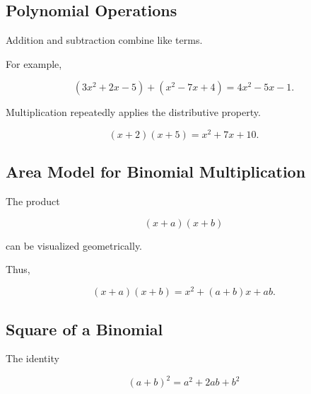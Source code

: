\subsection{Polynomial Operations}
\label{subsec:polynomial-operations}

Addition and subtraction combine like terms.

For example,

\[ (3x^2+2x-5)+(x^2-7x+4)=4x^2-5x-1. \]

Multiplication repeatedly applies the distributive property.

\[ (x+2)(x+5)=x^2+7x+10. \]

\subsection{Area Model for Binomial Multiplication}
\label{subsec:area-model-binomial}

The product

\[ (x+a)(x+b) \]

can be visualized geometrically.

\begin{center}
\end{center}

Thus,

\[ (x+a)(x+b)=x^2+(a+b)x+ab. \]

\subsection{Square of a Binomial}
\label{subsec:square-binomial}

The identity

\[ (a+b)^2=a^2+2ab+b^2 \]

